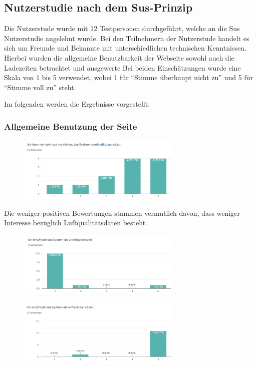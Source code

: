 \subsection{Nutzerstudie nach dem Sus-Prinzip}
Die Nutzerstude wurde mit 12 Testpersonen durchgeführt, welche an die Sus Nutzerstudie angelehnt wurde. 
Bei den Teilnehmern der Nutzerstude handelt es sich um Freunde und Bekannte mit unterschiedlichen technischen Kenntnissen. 
Hierbei wurden die allgemeine Benutzbarkeit der Webseite sowohl auch die Ladezeiten betrachtet und ausgewerte
Bei beiden Einschätzungen wurde eine Skala von 1 bis 5 verwendet, wobei 1 für \enquote{Stimme überhaupt nicht zu} und 5 für \enquote{Stimme voll zu} steht.

Im folgenden werden die Ergebnisse vorgestellt.
\subsubsection{Allgemeine Benutzung der Seite}
\begin{figure}[H]
    \centering
    \includegraphics[width=0.7\textwidth]{media/survey/regularUsage.png}
\end{figure}
Die weniger positiven Bewertungen stammen vermutlich davon, dass weniger Interesse bezüglich Luftqualitätsdaten besteht.

\begin{figure}[H]
    \centering
    \includegraphics[width=0.7\textwidth]{media/survey/complexity.png}
\end{figure}

\noChanges

\begin{figure}[H]
    \centering
    \includegraphics[width=0.7\textwidth]{media/survey/easyUsage.png}
\end{figure}

